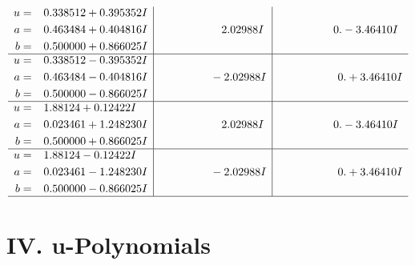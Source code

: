 \documentclass[1p]{elsarticle_modified}
\theoremstyle{definition}
\begin{document}
$$\begin{array}{c|c|c}
\begin{aligned}
u &= \phantom{-}0.338512 + 0.395352 I \\
a &= \phantom{-}0.463484 + 0.404816 I \\
b &= \phantom{-}0.500000 + 0.866025 I\end{aligned}
 & \phantom{-0.000000 -}2.02988 I & \phantom{-0.000000 } 0. - 3.46410 I \\ \hline\begin{aligned}
u &= \phantom{-}0.338512 - 0.395352 I \\
a &= \phantom{-}0.463484 - 0.404816 I \\
b &= \phantom{-}0.500000 - 0.866025 I\end{aligned}
 & \phantom{-0.000000 } -2.02988 I & \phantom{-0.000000 -}0. + 3.46410 I \\ \hline\begin{aligned}
u &= \phantom{-}1.88124 + 0.12422 I \\
a &= \phantom{-}0.023461 + 1.248230 I \\
b &= \phantom{-}0.500000 + 0.866025 I\end{aligned}
 & \phantom{-0.000000 -}2.02988 I & \phantom{-0.000000 } 0. - 3.46410 I \\ \hline\begin{aligned}
u &= \phantom{-}1.88124 - 0.12422 I \\
a &= \phantom{-}0.023461 - 1.248230 I \\
b &= \phantom{-}0.500000 - 0.866025 I\end{aligned}
 & \phantom{-0.000000 } -2.02988 I & \phantom{-0.000000 -}0. + 3.46410 I\\
 \hline 
 \end{array}$$\newpage
\newpage\renewcommand{\arraystretch}{1}
\centering \section*{ IV. u-Polynomials}
\end{document}
